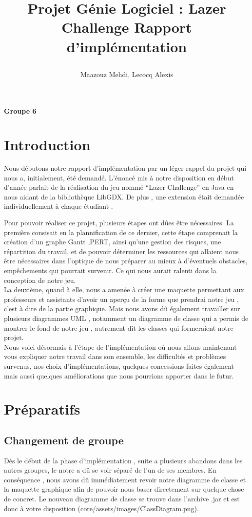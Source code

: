 \documentclass[a4paper,10pt]{article}
\title{
    \begin{minipage}\linewidth
        \centering\bfseries\sffamily
        Projet Génie Logiciel : Lazer Challenge
        \vskip3pt
        \large Rapport d'implémentation
    \end{minipage}
    }
\author{Maazouz Mehdi, Lecocq Alexis}
\begin{document}
\maketitle
\textbf{Groupe 6}
\tableofcontents
\newpage
\section{Introduction}
  Nous débutons notre rapport d'implémentation par un léger rappel du projet qui nous a, initialement, été demandé. 
L'énoncé mis à notre disposition en début d'année parlait de la réalisation du jeu nommé ``Lazer Challenge'' en Java
en nous aidant de la bibliothèque LibGDX. De plus , une extension était demandée individuellement à chaque étudiant .

Pour pouvoir réaliser ce projet, plusieurs étapes ont dûes être nécessaires. La première consisait en la plannification de ce dernier,
 cette étape comprenait la création d'un graphe Gantt ,PERT, ainsi qu'une gestion des risques, une répartition du travail,
 et de pouvoir déterminer les ressources qui allaient nous être nécessaires dans l'optique de nous préparer au mieux à d'éventuels
 obstacles, empêchements qui pourrait survenir. Ce qui nous aurait ralenti dans la conception de notre jeu.\\ La deuxième, quand à elle, nous a amenée
 à créer une maquette permettant aux professeurs et assistants d'avoir un aperçu de la forme que prendrai notre jeu , c'est à dire de la partie graphique.
 Mais nous avons dû également travailler sur plusieurs diagrammes UML , notamment un diagramme de classe qui a permis de montrer le fond de notre jeu , autrement dit les classes
 qui formeraient notre projet.\\
 Nous voici désormais à l'étape de l'implémentation où nous allons maintenant vous expliquer notre travail dans son ensemble,
 les difficultés et problèmes survenus, nos choix d'implémentations, quelques concessions faites également mais aussi quelques améliorations que nous
 pourrions apporter dans le futur.
\section{Préparatifs}
\subsection{Changement de groupe} 
Dès le début de la phase d'implémentation , suite a plusieurs abandons dans les autres groupes, le notre a dû se voir séparé de l'un de ses membres.
En conséquence , nous avons dû immédiatement revoir notre diagramme de classe et la maquette graphique afin de pouvoir nous baser directement sur quelque chose
de concret. Le nouveau diagramme de classe se trouve dans l'archive .jar et est donc à votre disposition (core/assets/images/ClassDiagram.png).
\end{document}
